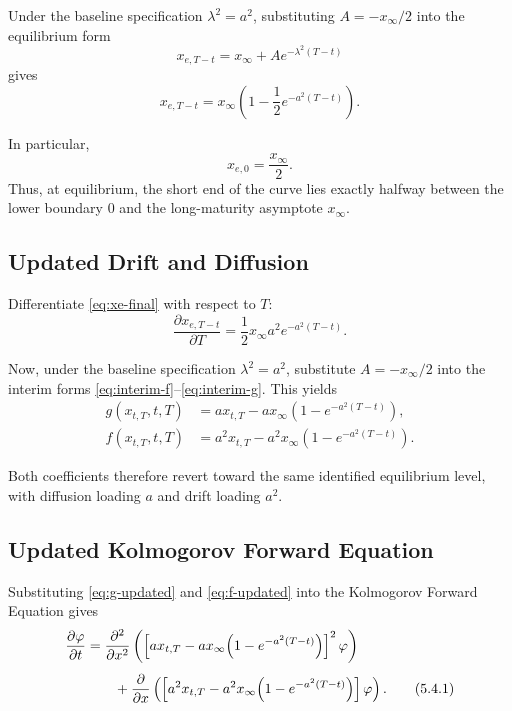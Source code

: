 \documentclass[12pt]{article}
\theoremstyle{statementstyle}
\begin{document}
Under the baseline specification \(\lambda^{2}=a^{2}\), substituting
\(A=-x_{\infty}/2\) into the equilibrium form
\[
x_{e,T-t}=x_{\infty}+A e^{-\lambda^{2}(T-t)}
\]
gives
\begin{equation}
x_{e,T-t}
=
x_{\infty}
\left(
1-\frac12 e^{-a^{2}(T-t)}
\right).
\tag{5.2.1}\label{eq:xe-final}
\end{equation}

In particular,
\[
x_{e,0}=\frac{x_{\infty}}{2}.
\]
Thus, at equilibrium, the short end of the curve lies exactly halfway
between the lower boundary \(0\) and the long-maturity asymptote
\(x_{\infty}\).

\subsection{Updated Drift and Diffusion}
\label{subsec:updated-drift-diffusion}

Differentiate \eqref{eq:xe-final} with respect to \(T\):
\[
\frac{\partial x_{e,T-t}}{\partial T}
=
\frac12 x_{\infty} a^{2} e^{-a^{2}(T-t)}.
\]

Now, under the baseline specification \(\lambda^{2}=a^{2}\), substitute
\(A=-x_{\infty}/2\) into the interim forms
\eqref{eq:interim-f}--\eqref{eq:interim-g}. This yields
\begin{align}
g(x_{t,T},t,T)
&=
a x_{t,T}
-
a x_{\infty}\!\left(1-e^{-a^{2}(T-t)}\right),
\tag{5.3.1a}\label{eq:g-updated}
\\[0.4em]
f(x_{t,T},t,T)
&=
a^{2}x_{t,T}
-
a^{2}x_{\infty}\!\left(1-e^{-a^{2}(T-t)}\right).
\tag{5.3.1b}\label{eq:f-updated}
\end{align}

Both coefficients therefore revert toward the same identified
equilibrium level, with diffusion loading \(a\) and drift loading
\(a^{2}\).

\subsection{Updated Kolmogorov Forward Equation}
\label{subsec:updated-kfe}

Substituting \eqref{eq:g-updated} and \eqref{eq:f-updated} into the
Kolmogorov Forward Equation gives
\begin{align}
\frac{\partial \varphi}{\partial t}
&=
\frac{\partial^{2}}{\partial x^{2}}
\left(
\left[
a x_{t,T}
-
a x_{\infty}\!\left(1-e^{-a^{2}(T-t)}\right)
\right]^{2}
\varphi
\right)
\notag\\[0.4em]
&\qquad
+
\frac{\partial}{\partial x}
\left(
\left[
a^{2}x_{t,T}
-
a^{2}x_{\infty}\!\left(1-e^{-a^{2}(T-t)}\right)
\right]
\varphi
\right).
\tag{5.4.1}\label{eq:kfe-updated}
\end{align}
\end{document}

